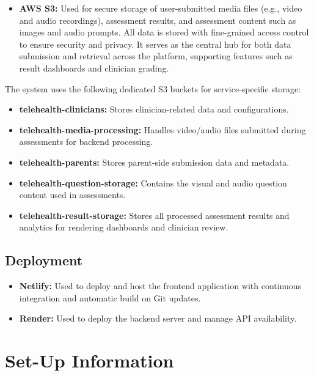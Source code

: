 \documentclass{article}
\begin{document}
\begin{itemize}
    \item \textbf{AWS S3:} Used for secure storage of user-submitted media files (e.g., video and audio recordings), assessment results, and assessment content such as images and audio prompts. All data is stored with fine-grained access control to ensure security and privacy. It serves as the central hub for both data submission and retrieval across the platform, supporting features such as result dashboards and clinician grading.
\end{itemize}

\noindent The system uses the following dedicated S3 buckets for service-specific storage:

\begin{itemize}
    \item \textbf{telehealth-clinicians:} Stores clinician-related data and configurations.
    \item \textbf{telehealth-media-processing:} Handles video/audio files submitted during assessments for 
    backend processing.
    \item \textbf{telehealth-parents:} Stores parent-side submission data and metadata.
    \item \textbf{telehealth-question-storage:} Contains the visual and audio question content used in assessments.
    \item \textbf{telehealth-result-storage:} Stores all processed assessment results and analytics for rendering dashboards and clinician review.
\end{itemize}

\subsection{Deployment}
\begin{itemize}
    \item \textbf{Netlify:} Used to deploy and host the frontend application with continuous integration and automatic build on Git updates.
    \item \textbf{Render:} Used to deploy the backend server and manage API availability.
\end{itemize}



\section{Set-Up Information}
\end{document}
